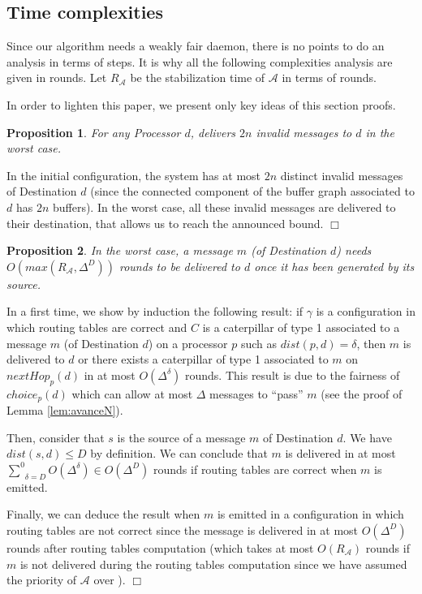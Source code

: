 \documentclass[11pt]{article}
\newtheorem{proposition}{Proposition}
\newenvironment{sketchproof}{{\noindent\bf Sketch of proof. } }{{\hfill $\Box$}}
\begin{document}
\subsection{Time complexities}\label{sub:analyseN}

Since our algorithm needs a weakly fair daemon, there is no points to do an analysis in terms of steps. It is why all the following complexities analysis are given in rounds. Let $R_{\mathcal{A}}$ be the stabilization time of $\mathcal{A}$ in terms of rounds.

In order to lighten this paper, we present only key ideas of this section proofs.

\begin{proposition} \label{prop:analysemesN}
For any Processor $d$, \AN delivers $2n$ invalid messages to $d$ in the worst case.
\end{proposition}

\begin{sketchproof}
In the initial configuration, the system has at most $2n$ distinct invalid messages of Destination $d$ (since the connected component of the buffer graph associated to $d$ has $2n$ buffers). In the worst case, all these invalid messages are delivered to their destination, that allows us to reach the announced bound.
\end{sketchproof}

\begin{proposition} \label{prop:complexiteN}
In the worst case, a message $m$ (of Destination $d$) needs $O(max(R_{\mathcal{A}},\Delta^{D}))$ rounds to be delivered to $d$ once it has been generated by its source.
\end{proposition}

\begin{sketchproof}
In a first time, we show by induction the following result: if $\gamma$ is a configuration in which routing tables are correct and $C$ is a caterpillar of type 1 associated to a message $m$ (of Destination $d$) on a processor $p$ such as $dist(p,d)=\delta$, then $m$ is delivered to $d$ or there exists a caterpillar of type 1 associated to $m$ on $nextHop_{p}(d)$ in at most $O(\Delta^{\delta})$ rounds. This result is due to the fairness of $choice_{p}(d)$ which can allow at most $\Delta$ messages to ``pass'' $m$ (see the proof of Lemma \ref{lem:avanceN}). 

Then, consider that $s$ is the source of a message $m$ of Destination $d$. We have $dist(s,d)\leq D$ by definition. We can conclude that $m$ is delivered in at most $\underset{\delta=D}{\overset{0}{\sum}}O(\Delta^{\delta})\in O(\Delta^{D})$ rounds if routing tables are correct when $m$ is emitted. 

Finally, we can deduce the result when $m$ is emitted in a configuration in which routing tables are not correct since the message is delivered in at most $O(\Delta^{D})$ rounds after routing tables computation (which takes at most $O(R_{\mathcal{A}})$ rounds if $m$ is not delivered during the routing tables computation since we have assumed the priority of $\mathcal{A}$ over \AN).
\end{sketchproof}
\end{document}
